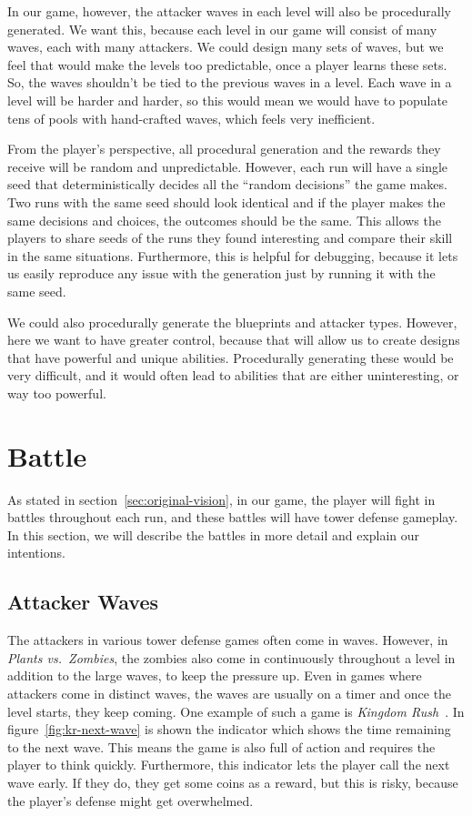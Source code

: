 In our game, however, the attacker waves in each level will also be procedurally generated.
We want this, because each level in our game will consist of many waves, each with many attackers.
We could design many sets of waves, but we feel that would make the levels too predictable, once a player learns these sets.
So, the waves shouldn't be tied to the previous waves in a level.
Each wave in a level will be harder and harder, so this would mean we would have to populate tens of pools with hand-crafted waves, which feels very inefficient.

From the player's perspective, all procedural generation and the rewards they receive will be random and unpredictable.
However, each run will have a single seed that deterministically decides all the \enquote{random decisions} the game makes.
Two runs with the same seed should look identical and if the player makes the same decisions and choices, the outcomes should be the same.
This allows the players to share seeds of the runs they found interesting and compare their skill in the same situations.
Furthermore, this is helpful for debugging, because it lets us easily reproduce any issue with the generation just by running it with the same seed.

We could also procedurally generate the blueprints and attacker types.
However, here we want to have greater control, because that will allow us to create designs that have powerful and unique abilities.
Procedurally generating these would be very difficult, and it would often lead to abilities that are either uninteresting, or way too powerful.

\section{Battle}

As stated in section~\ref{sec:original-vision}, in our game, the player will fight in battles throughout each run, and these battles will have tower defense gameplay.
In this section, we will describe the battles in more detail and explain our intentions.

\subsection{Attacker Waves}\label{sec:design-attacker-waves}

The attackers in various tower defense games often come in waves.
However, in \emph{Plants vs.\ Zombies}, the zombies also come in continuously throughout a level in addition to the large waves, to keep the pressure up.
Even in games where attackers come in distinct waves, the waves are usually on a timer and once the level starts, they keep coming.
One example of such a game is \emph{Kingdom Rush}~\cite{kingdomRush}.
In figure~\ref{fig:kr-next-wave} is shown the indicator which shows the time remaining to the next wave.
This means the game is also full of action and requires the player to think quickly.
Furthermore, this indicator lets the player call the next wave early.
If they do, they get some coins as a reward, but this is risky, because the player's defense might get overwhelmed.

